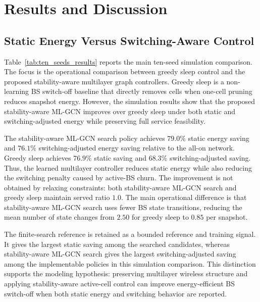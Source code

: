 \documentclass[journal]{IEEEtran}
\begin{document}
\section{Results and Discussion}

\subsection{Static Energy Versus Switching-Aware Control}

Table~\ref{tab:ten_seeds_results} reports the main ten-seed simulation
comparison. The focus is the operational comparison between greedy sleep
control and the proposed stability-aware multilayer graph controllers. Greedy
sleep is a non-learning BS switch-off baseline that directly
removes cells when one-cell pruning reduces snapshot energy. However, the
simulation results show that the proposed stability-aware ML-GCN improves
over greedy sleep under both static and switching-adjusted energy while
preserving full service feasibility.

The stability-aware ML-GCN search policy achieves $79.0\%$ static energy
saving and $76.1\%$ switching-adjusted energy saving relative to the all-on
network. Greedy sleep achieves $76.9\%$ static saving and $68.3\%$
switching-adjusted saving. Thus, the learned multilayer controller reduces
static energy while also reducing the switching penalty caused by active-BS
churn. The improvement is not obtained by relaxing constraints: both
stability-aware ML-GCN search and greedy sleep maintain served ratio $1.0$.
The main operational difference is that stability-aware ML-GCN search uses
fewer BS state transitions, reducing the mean number of state changes from
$2.50$ for greedy sleep to $0.85$ per snapshot.

The finite-search reference is retained as a bounded reference and training
signal. It gives the largest static saving among the searched candidates,
whereas stability-aware ML-GCN search gives the largest switching-adjusted
saving among the implementable policies in this simulation comparison. This
distinction supports the modeling hypothesis: preserving multilayer wireless
structure and applying stability-aware active-cell control can improve
energy-efficient BS switch-off when both static energy and switching behavior
are reported.
\end{document}
